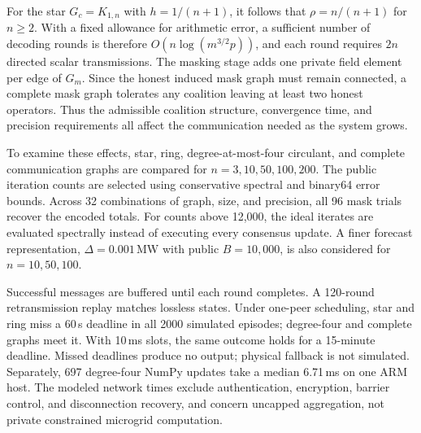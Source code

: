 \documentclass[journal]{IEEEtran}
\begin{document}
For the star $G_c=K_{1,n}$ with $h=1/(n+1)$, it follows that $\rho=n/(n+1)$ for $n\geq2$. With a fixed allowance for arithmetic error, a sufficient number of decoding rounds is therefore $O(n\log(m^{3/2}p))$, and each round requires $2n$ directed scalar transmissions. The masking stage adds one private field element per edge of $G_m$. Since the honest induced mask graph must remain connected, a complete mask graph tolerates any coalition leaving at least two honest operators. Thus the admissible coalition structure, convergence time, and precision requirements all affect the communication needed as the system grows.

To examine these effects, star, ring, degree-at-most-four circulant, and complete communication graphs are compared for $n=3,10,50,100,200$. The public iteration counts are selected using conservative spectral and binary64 error bounds. Across 32 combinations of graph, size, and precision, all 96 mask trials recover the encoded totals. For counts above 12,000, the ideal iterates are evaluated spectrally instead of executing every consensus update. A finer forecast representation, $\Delta=0.001$\,MW with public $B=10{,}000$, is also considered for $n=10,50,100$.

\begin{table}[t]
\centering
\caption{Uncapped aggregation for $n=100$ and $\Delta=0.001$\,MW with 1\,ms transmission/acknowledgment slots, independent 20\% attempt loss, and reliable retries. Message counts exclude mask exchange; modeled times include cycle-mask exchange under parallel-link or one-peer-per-node scheduling.}
\label{tab:communication_extended}
\end{table}

Successful messages are buffered until each round completes. A 120-round retransmission replay matches lossless states. Under one-peer scheduling, star and ring miss a 60\,s deadline in all 2000 simulated episodes; degree-four and complete graphs meet it. With 10\,ms slots, the same outcome holds for a 15-minute deadline. Missed deadlines produce no output; physical fallback is not simulated. Separately, 697 degree-four NumPy updates take a median 6.71\,ms on one ARM host. The modeled network times exclude authentication, encryption, barrier control, and disconnection recovery, and concern uncapped aggregation, not private constrained microgrid computation.
\end{document}

